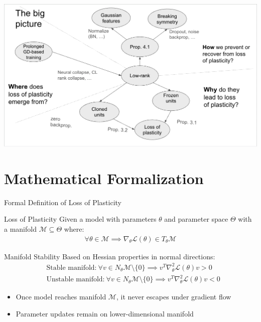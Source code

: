 \documentclass{beamer}
\begin{document}
\begin{frame}{}
    \includegraphics[width=\textwidth]{images/bp.png}
\end{frame}

\section{Mathematical Formalization}

\begin{frame}{Formal Definition of Loss of Plasticity}
    \begin{block}{Loss of Plasticity}
        Given a model with parameters $\theta$ and parameter space $\Theta$ with a manifold $\mathcal{M} \subseteq \Theta$ where:
        \begin{align}
            \forall \theta \in \mathcal{M} \implies \nabla_\theta\mathcal{L}(\theta) \in T_\theta\mathcal{M}
        \end{align}
    \end{block}
        \begin{block}{Manifold Stability}
        Based on Hessian properties in normal directions:
        \begin{align}
            &\text{Stable manifold:}\ \forall v \in N_\theta\mathcal{M} \setminus \{0\} \implies v^T\nabla_\theta^2 \mathcal{L}(\theta)v > 0 \\
            &\text{Unstable manifold:}\ \forall v \in N_\theta\mathcal{M} \setminus \{0\} \implies v^T\nabla_\theta^2 \mathcal{L}(\theta)v < 0
        \end{align}
    \end{block}
    
    \begin{itemize}
        \item Once model reaches manifold $\mathcal{M}$, it never escapes under gradient flow
        \item Parameter updates remain on lower-dimensional manifold
    \end{itemize}
\end{frame}
\end{document}
